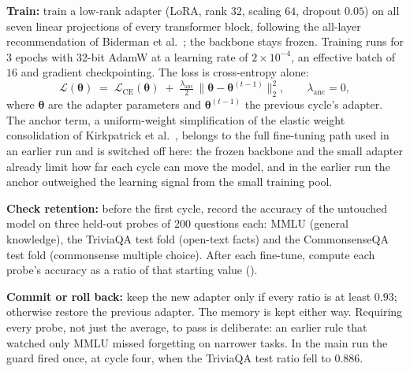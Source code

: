 \textbf{Train:} train a low-rank adapter (LoRA, rank $32$, scaling $64$, dropout $0.05$) on all seven linear projections of every transformer block, following the all-layer recommendation of Biderman et al.~\cite{biderman2024lora}; the backbone stays frozen. Training runs for $3$ epochs with 32-bit AdamW at a learning rate of $2 \times 10^{-4}$, an effective batch of $16$ and gradient checkpointing. The loss is cross-entropy alone:
\begin{equation}
\mathcal{L}(\boldsymbol{\theta}) \;=\; \mathcal{L}_{\mathrm{CE}}(\boldsymbol{\theta}) \;+\; \tfrac{\lambda_{\text{anc}}}{2}\, \big\| \boldsymbol{\theta} - \boldsymbol{\theta}^{(t-1)} \big\|_{2}^{2}, \qquad \lambda_{\text{anc}} = 0,
\label{eq:sil-anchor}
\end{equation}
where $\boldsymbol{\theta}$ are the adapter parameters and $\boldsymbol{\theta}^{(t-1)}$ the previous cycle's adapter. The anchor term, a uniform-weight simplification of the elastic weight consolidation of Kirkpatrick et al.~\cite{doi:10.1073/pnas.1611835114}, belongs to the full fine-tuning path used in an earlier run and is switched off here: the frozen backbone and the small adapter already limit how far each cycle can move the model, and in the earlier run the anchor outweighed the learning signal from the small training pool.

\textbf{Check retention:} before the first cycle, record the accuracy of the untouched model on three held-out probes of $200$ questions each: MMLU (general knowledge), the TriviaQA test fold (open-text facts) and the CommonsenseQA test fold (commonsense multiple choice). After each fine-tune, compute each probe's accuracy as a ratio of that starting value ().

\textbf{Commit or roll back:} keep the new adapter only if every ratio is at least $0.93$; otherwise restore the previous adapter. The memory is kept either way. Requiring every probe, not just the average, to pass is deliberate: an earlier rule that watched only MMLU missed forgetting on narrower tasks. In the main run the guard fired once, at cycle four, when the TriviaQA test ratio fell to $0.886$.

